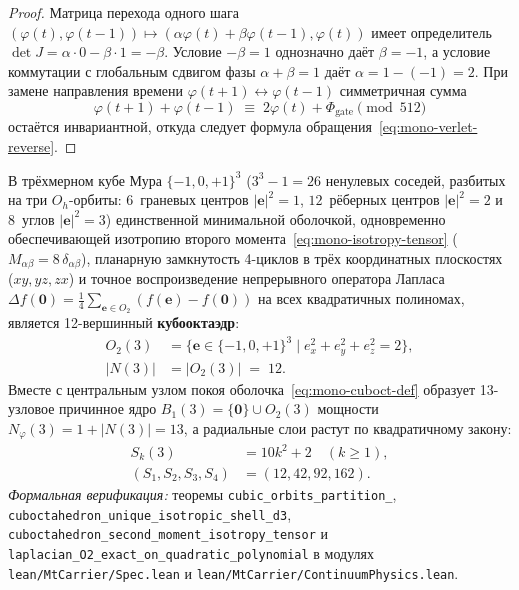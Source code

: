 \begin{proof}
Матрица перехода одного шага $(\varphi(t), \varphi(t-1)) \mapsto (\alpha\varphi(t) + \beta\varphi(t-1), \varphi(t))$ имеет определитель $\det J = \alpha\cdot 0 - \beta\cdot 1 = -\beta$. Условие $-\beta = 1$ однозначно даёт $\beta = -1$, а условие коммутации с глобальным сдвигом фазы $\alpha + \beta = 1$ даёт $\alpha = 1 - (-1) = 2$. При замене направления времени $\varphi(t+1) \leftrightarrow \varphi(t-1)$ симметричная сумма
\[
  \varphi(t+1) + \varphi(t-1) \;\equiv\; 2\varphi(t) + \Phi_{\mathrm{gate}} \pmod{512}
\]
остаётся инвариантной, откуда следует формула обращения~\eqref{eq:mono-verlet-reverse}.
\end{proof}

\begin{theorem}
\label{thm:mono-cuboct-uniqueness}
В трёхмерном кубе Мура $\{-1, 0, +1\}^3$ ($3^3 - 1 = 26$ ненулевых соседей, разбитых на три $O_h$-орбиты: $6$~граневых центров $|\mathbf{e}|^2=1$, $12$~рёберных центров $|\mathbf{e}|^2=2$ и $8$~углов $|\mathbf{e}|^2=3$) единственной минимальной оболочкой, одновременно обеспечивающей изотропию второго момента~\eqref{eq:mono-isotropy-tensor} ($M_{\alpha\beta} = 8\,\delta_{\alpha\beta}$), планарную замкнутость 4-циклов в трёх координатных плоскостях ($xy, yz, zx$) и точное воспроизведение непрерывного оператора Лапласа $\Delta f(\mathbf{0}) = \frac{1}{4}\sum_{\mathbf{e}\in O_2}(f(\mathbf{e}) - f(\mathbf{0}))$ на всех квадратичных полиномах, является 12-вершинный \textbf{кубооктаэдр}:
\begin{align}
  O_2(3) &= \bigl\{\mathbf{e} \in \{-1, 0, +1\}^3 \;\big|\; e_x^2 + e_y^2 + e_z^2 = 2\bigr\}, \label{eq:mono-cuboct-def} \\
  |N(3)| &= |O_2(3)| \;=\; 12. \label{eq:mono-cuboct-card}
\end{align}
Вместе с центральным узлом покоя оболочка~\eqref{eq:mono-cuboct-def} образует 13-узловое причинное ядро $B_1(3) = \{\mathbf{0}\} \cup O_2(3)$ мощности $N_\varphi(3) = 1 + |N(3)| = 13$, а радиальные слои растут по квадратичному закону:
\begin{align}
  S_k(3) &= 10k^2 + 2 \quad (k \ge 1), \label{eq:mono-cuboct-shells} \\
  (S_1, S_2, S_3, S_4) &= (12, 42, 92, 162). \label{eq:mono-cuboct-shells-1234}
\end{align}
\emph{Формальная верификация:} теоремы \texttt{cubic\_\allowbreak orbits\_\allowbreak partition\_}, \texttt{cuboctahedron\_\allowbreak unique\_\allowbreak isotropic\_\allowbreak shell\_\allowbreak d3}, \texttt{cuboctahedron\_\allowbreak second\_\allowbreak moment\_\allowbreak isotropy\_\allowbreak tensor} и \texttt{laplacian\_\allowbreak O2\_\allowbreak exact\_\allowbreak on\_\allowbreak quadratic\_\allowbreak polynomial} в модулях \texttt{lean/\allowbreak MtCarrier/\allowbreak Spec.lean} и \texttt{lean/\allowbreak MtCarrier/\allowbreak ContinuumPhysics.lean}.
\end{theorem}

